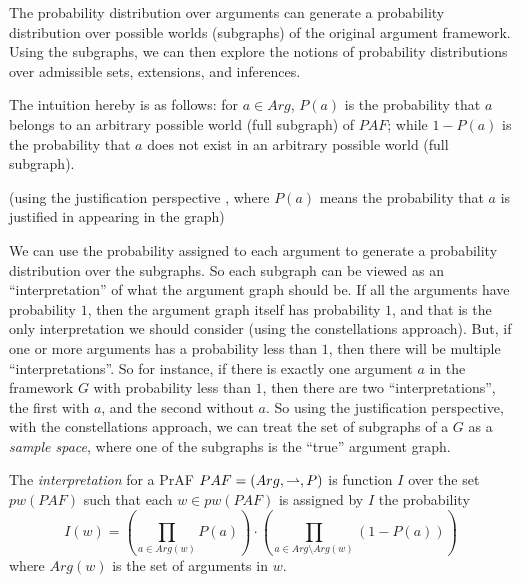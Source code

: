 



The probability distribution over arguments can generate a probability distribution over  possible worlds (subgraphs) of the original argument framework. 
% 
Using the subgraphs, 
we can then explore the notions of probability distributions over admissible sets, extensions, and inferences.




The intuition hereby is as follows: 
for $a \in Arg$, 
$P(a)$ is the probability that $a$ belongs to an arbitrary possible world (full subgraph) of $PAF$; 
while $1-P(a)$ is the probability that $a$ does not exist in an arbitrary possible world (full subgraph). 


(using the justification perspective \cite{Hun2012}, 
where $P(a)$ means the probability that $a$ is justified in appearing in the graph) 



\vspace{1.5em}


We can use the probability assigned to each argument to generate a probability distribution over the subgraphs. 
So each subgraph can be viewed as an ``interpretation'' of what the argument graph should be. 
If all the arguments have probability $1$, 
then the argument graph itself has probability $1$, 
and that is the only interpretation we should consider (using the constellations approach). 
But, if one or more arguments has a probability less than $1$, 
then there will be multiple ``interpretations''. 
% 
So for instance, 
if there is exactly one argument $a$ in the framework $G$ with probability less than $1$, 
then there are two “interpretations”, 
the first with $a$, 
and the second without $a$. 
% 
So using the justification perspective, 
with the constellations approach, 
we can treat the set of subgraphs of a $G$ as a \textit{sample space}, 
where one of the subgraphs is the ``true'' argument graph.


\vspace{1.5em}




\begin{df}
    The \textit{interpretation} for a PrAF $PAF=(Arg,\rightharpoonup,P)$ is  function 
    $I$ over the set $pw(PAF)$ such that 
    each $w \in pw(PAF)$ is assigned by $I$ the probability 
    \[
        I(w) = \left( \prod_{a\in Arg(w)} P(a) \right) 
        \cdot
        \left( \prod_{a \in Arg \setminus Arg(w)} (1 - P(a)) \right)
    \]
    where $Arg(w)$ is the set of arguments in $w$.
\end{df}


